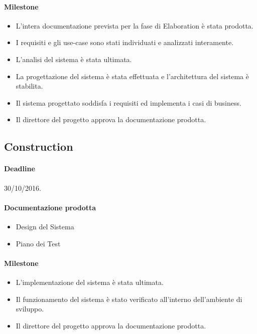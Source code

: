 \paragraph{Milestone}
\begin{itemize}
	\item L'intera documentazione prevista per la fase di Elaboration \`e stata prodotta.
	\item I requisiti e gli use-case sono stati individuati e analizzati interamente.
	\item L'analisi del sistema \`e stata ultimata.
	\item La progettazione del sistema \`e stata effettuata e l'architettura del sistema \`e stabilita.
	\item Il sistema progettato soddisfa i requisiti ed implementa i casi di business.
	\item Il direttore del progetto approva la documentazione prodotta.
\end{itemize}

\subsection{Construction}

\paragraph{Deadline}
30/10/2016.

\paragraph{Documentazione prodotta}
\begin{itemize}
	\item Design del Sistema
	\item Piano dei Test
\end{itemize}

\paragraph{Milestone}
\begin{itemize}
	\item L'implementazione del sistema \`e stata ultimata.
	\item Il funzionamento del sistema \`e stato verificato all'interno dell'ambiente di sviluppo.
	\item Il direttore del progetto approva la documentazione prodotta.
\end{itemize}

